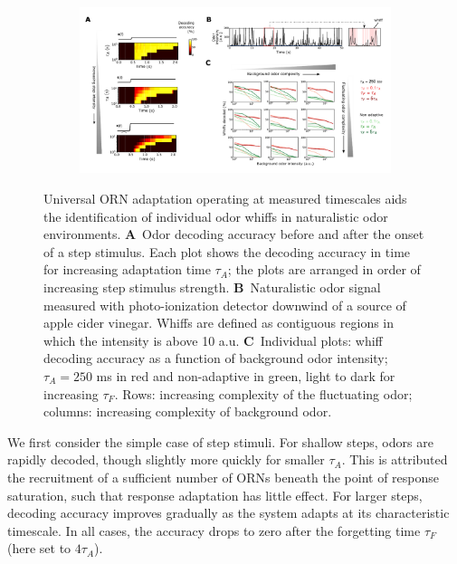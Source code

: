 \begin{figure}[!tb]
	\begin{subfigure}[t]{\linewidth}
		{\includegraphics[width=\linewidth]{figures/4_temporal_coding}}
		\label{fig:temporal_coding_a}
	\end{subfigure}
	\begin{subfigure}[t]{0\linewidth}
		\label{fig:temporal_coding_b}
	\end{subfigure}
	\begin{subfigure}[t]{0\linewidth}
		\label{fig:temporal_coding_c}
	\end{subfigure}
	\caption{\footnotesize{Universal ORN adaptation operating at measured timescales aids the identification of individual odor whiffs in naturalistic odor environments.
    \textbf{A}~Odor decoding accuracy before and after the onset of a step stimulus. Each plot shows the decoding accuracy in time for increasing adaptation time $\tau_A$; the plots are arranged in order of increasing step stimulus strength. 
    \textbf{B}~Naturalistic odor signal measured with photo-ionization detector downwind of a source of apple cider vinegar. Whiffs are defined as contiguous regions in which the intensity is above 10 a.u.
    \textbf{C}~Individual plots: whiff decoding accuracy as a function of background odor intensity; $\tau_A = 250$ ms in red and non-adaptive in green, light to dark for increasing $\tau_F$. Rows: increasing complexity of the fluctuating odor; columns: increasing complexity of background odor. }}
	\label{fig:temporal_coding}
\end{figure}

We first consider the simple case of step stimuli. For shallow steps, odors are rapidly decoded, though slightly more quickly for smaller $\tau_A$. This is attributed the recruitment of a sufficient number of ORNs beneath the point of response saturation, such that response adaptation has little effect. For larger steps, decoding accuracy improves gradually as the system adapts at its characteristic timescale. In all cases, the accuracy drops to zero after the forgetting time $\tau_F$ (here set to $4\tau_A$). 

